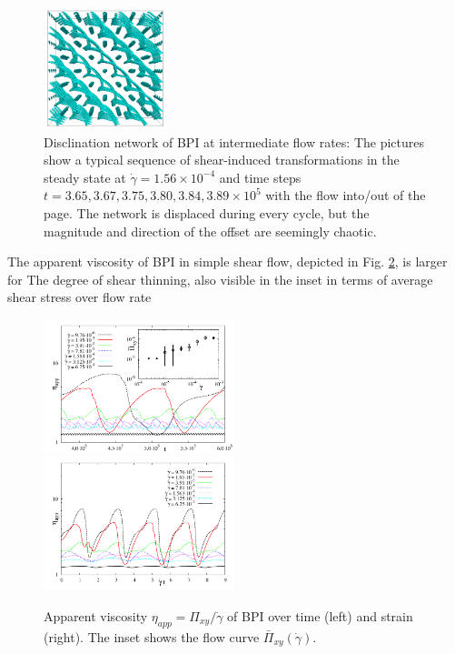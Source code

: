 \documentclass[aps,pre,reprint,superscriptaddress]{revtex4}
\newcommand{\e}[1]{\times10^{#1}}
\newcommand{\gd}{\dot{\gamma}}
\begin{document}
\begin{figure}[h]
\includegraphics[width=0.32\textwidth]{disc-389k_run914.png}
\caption{Disclination network of BPI at intermediate flow rates: The pictures show a typical sequence of shear-induced transformations in the steady state at $\gd=1.56\e{-4}$ and time steps $t=3.65, 3.67,3.75,3.80,3.84,3.89\e{5}$ with the flow into/out of the page. The network is displaced during every cycle, but the magnitude and direction of the offset are seemingly chaotic.}
\label{bp1-med}
\end{figure}

The apparent viscosity of BPI in simple shear flow, depicted in Fig. \ref{bp1-rheo}, is larger for The degree of shear thinning, also visible in the inset in terms of average shear stress over
flow rate 

\begin{figure}[h]
\includegraphics[width=0.495\textwidth]{stress_bp1.pdf}
\includegraphics[width=0.495\textwidth]{stress_vs_strain_bp1.pdf}
\caption{Apparent viscosity $\eta_{app}=\Pi_{xy}/\dot{\gamma}$ of BPI over time (left) and strain (right). The inset shows the flow curve $\bar{\Pi}_{xy}(\gd)$.}
\label{bp1-rheo}
\end{figure}
\end{document}
